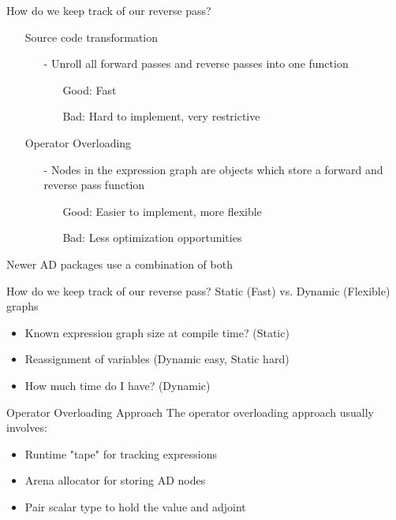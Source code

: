\documentclass[dvipsnames]{beamer}
\begin{document}
\begin{frame}{How do we keep track of our reverse pass?}
\begin{itemize}
  \item[] Source code transformation
    \begin{itemize}
        \item[-] Unroll all forward passes and reverse passes into one function
        \begin{itemize}
            \item[Good:] Fast
            \item[Bad:] Hard to implement, very restrictive
        \end{itemize}
    \end{itemize}

    \item[] Operator Overloading
    \begin{itemize}
        \item[-] Nodes in the expression graph are objects which store a forward and reverse pass function
        \begin{itemize}
          \item[Good:] Easier to implement, more flexible
          \item[Bad:] Less optimization opportunities
        \end{itemize}
    \end{itemize}
\end{itemize}
Newer AD packages use a combination of both
\end{frame}

\begin{frame}{How do we keep track of our reverse pass?}
Static (Fast) vs. Dynamic (Flexible) graphs
\begin{itemize}
\item Known expression graph size at compile time? (Static)
\item Reassignment of variables (Dynamic easy, Static hard)
\item How much time do I have? (Dynamic)
\end{itemize}
\end{frame}

\begin{frame}{Operator Overloading Approach}
The operator overloading approach usually involves:
\begin{itemize}
    \item Runtime "tape" for tracking expressions
    \item Arena allocator for storing AD nodes
    \item Pair scalar type to hold the value and adjoint
\end{itemize}
\end{frame}
\end{document}
